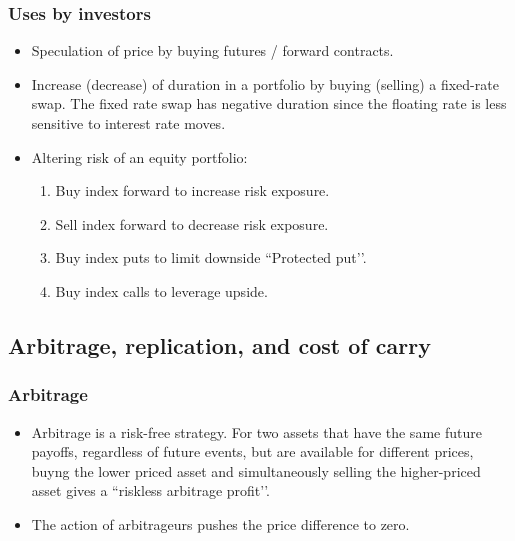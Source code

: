 \documentclass[../notes_compiled.tex]{subfiles}
\begin{document}
\subsubsection*{Uses by investors}
\begin{itemize}
\item Speculation of price by buying futures / forward contracts.
\item Increase (decrease) of duration in a portfolio by buying (selling) a fixed-rate swap. The fixed rate swap has negative duration since the floating rate is less sensitive to interest rate moves.
\item Altering risk of an equity portfolio:
\begin{enumerate}
\item Buy index forward to increase risk exposure.
\item Sell index forward to decrease risk exposure.
\item Buy index puts to limit downside ``Protected put’’.
\item Buy index calls to leverage upside.
\end{enumerate}
\end{itemize}

\subsection{Arbitrage, replication, and cost of carry}
\label{cash-and-carry}
\subsubsection*{Arbitrage}
\begin{itemize}
\item Arbitrage is a risk-free strategy. For two assets that have the same future payoffs, regardless of future events, but are available for different prices, buyng the lower priced asset and simultaneously selling the higher-priced asset gives a ``riskless arbitrage profit’’.
\item The action of arbitrageurs pushes the price difference to zero.
\end{itemize}
\end{document}
